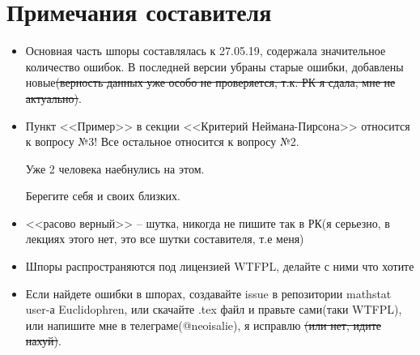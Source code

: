 \documentclass[a4paper, 12pt]{article}
\theoremstyle{definition}
\theoremstyle{leads}
\theoremstyle{example}
\theoremstyle{remark}
\begin{document}
\section{Примечания составителя}
\begin{itemize}
	\item Основная часть шпоры составлялась к 27.05.19, содержала значительное количество ошибок. В последней версии убраны старые ошибки, добавлены новые\sout{(верность данных уже особо не проверяется, т.к. РК я сдала, мне не актуально)}.
	
	\item Пункт <<Пример>> в секции <<Критерий Неймана-Пирсона>> относится к вопросу №3! Все остальное относится к вопросу №2. 
	
	Уже 2 человека наебнулись на этом.
	
    Берегите себя и своих близких.
	
	\item  <<расово верный>> -- шутка, никогда не пишите так в РК(я серьезно, в лекциях этого нет, это все шутки составителя, т.е меня)
	
	\item Шпоры распространяются под лицензией WTFPL, делайте с ними что хотите
	
	\item Если найдете ошибки в шпорах, создавайте  issue в репозитории  mathstat user-а Euclidophren, или скачайте .tex файл и правьте сами(таки WTFPL), или напишите мне в телеграме(@neoisalie), я исправлю \sout{(или нет, идите нахуй)}.
\end{itemize}
\end{document}
